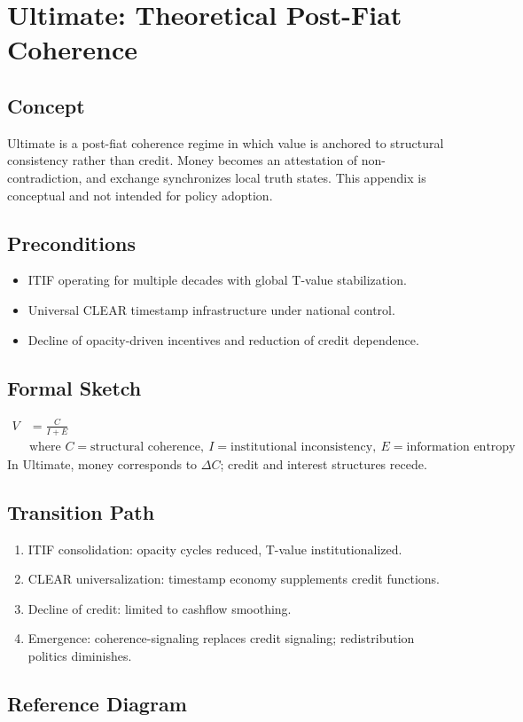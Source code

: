 \section{Ultimate: Theoretical Post-Fiat Coherence}
\subsection{Concept}
Ultimate is a post-fiat coherence regime in which value is anchored to structural consistency rather than credit. Money becomes an attestation of non-contradiction, and exchange synchronizes local truth states. This appendix is conceptual and not intended for policy adoption.

\subsection{Preconditions}
\begin{itemize}
  \item ITIF operating for multiple decades with global T-value stabilization.
  \item Universal CLEAR timestamp infrastructure under national control.
  \item Decline of opacity-driven incentives and reduction of credit dependence.
\end{itemize}

\subsection{Formal Sketch}
\begin{align*}
  V &= \frac{C}{I + E}\\
  &\text{where } C=\text{structural coherence},\ I=\text{institutional inconsistency},\ E=\text{information entropy}
\end{align*}
In Ultimate, money corresponds to \(\Delta C\); credit and interest structures recede.

\subsection{Transition Path}
\begin{enumerate}
  \item ITIF consolidation: opacity cycles reduced, T-value institutionalized.
  \item CLEAR universalization: timestamp economy supplements credit functions.
  \item Decline of credit: limited to cashflow smoothing.
  \item Emergence: coherence-signaling replaces credit signaling; redistribution politics diminishes.
\end{enumerate}

\subsection{Reference Diagram}
